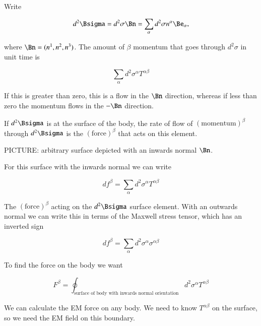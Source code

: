 Write

\begin{equation}\label{eqn:relativisticElectrodynamicsL23:310}
d^2 \Bsigma = d^2 \sigma \Bn = \sum_\alpha d^2 \sigma n^\alpha \Be_\alpha,
\end{equation}

where $\Bn = (n^1, n^2, n^3)$.  The amount of $\beta$ momentum that goes through $d^2 \sigma$ in unit time is 

\begin{equation}\label{eqn:relativisticElectrodynamicsL23:330}
\sum_\alpha d^2\sigma^\alpha T^{\alpha\beta} 
\end{equation}

If this is greater than zero, this is a flow in the $\Bn$ direction, whereas if less than zero the momentum flows in the $-\Bn$ direction.

If $d^2 \Bsigma$ is at the surface of the body, the rate of flow of $(\text{momentum})^\beta$ through $d^2 \Bsigma$ is the $(\text{force})^\beta$ that acts on this element.

PICTURE: arbitrary surface depicted with an inwards normal $\Bn$.

For this surface with the inwards normal we can write

\begin{equation}\label{eqn:relativisticElectrodynamicsL23:350}
df^\beta = \sum_\alpha d^2\sigma^\alpha T^{\alpha\beta}
\end{equation}

The $(\text{force})^\beta$ acting on the $d^2\Bsigma$ surface element.  With an outwards normal we can write this in terms of the Maxwell stress tensor, which has an inverted sign

\begin{equation}\label{eqn:relativisticElectrodynamicsL23:370}
df^\beta = \sum_\alpha d^2\sigma^\alpha \sigma^{\alpha\beta}
\end{equation}

To find the force on the body we want

\begin{equation}\label{eqn:relativisticElectrodynamicsL23:390}
F^\beta = \oint_{\text{surface of body with inwards normal orientation}} d^2 \sigma^\alpha T^{\alpha\beta}
\end{equation}

We can calculate the EM force on any body.  We need to know $T^{\alpha\beta}$ on the surface, so we need the EM field on this boundary.

